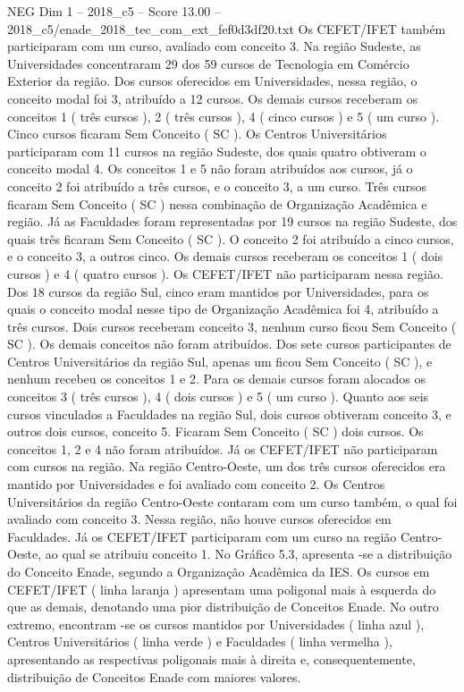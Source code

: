 \begin{textsample}{NEG Dim 1 – 2018\_c5 – Score 13.00 – 2018\_c5/enade\_2018\_tec\_com\_ext\_fef0d3df20.txt}
Os CEFET/IFET também participaram com um curso, avaliado com conceito 3.
Na região Sudeste, as Universidades concentraram 29 dos 59 cursos de Tecnologia em Comércio Exterior da região.
Dos cursos oferecidos em Universidades, nessa região, o conceito modal foi 3, atribuído a 12 cursos.
Os demais cursos receberam os conceitos 1 ( três cursos ), 2 ( três cursos ), 4 ( cinco cursos ) e 5 ( um curso ).
Cinco cursos ficaram Sem Conceito ( SC ).
Os Centros Universitários participaram com 11 cursos na região Sudeste, dos quais quatro obtiveram o conceito modal 4.
Os conceitos 1 e 5 não foram atribuídos aos cursos, já o conceito 2 foi atribuído a três cursos, e o conceito 3, a um curso.
Três cursos ficaram Sem Conceito ( SC ) nessa combinação de Organização Acadêmica e região.
Já as Faculdades foram representadas por 19 cursos na região Sudeste, dos quais três ficaram Sem Conceito ( SC ).
O conceito 2 foi atribuído a cinco cursos, e o conceito 3, a outros cinco.
Os demais cursos receberam os conceitos 1 ( dois cursos ) e 4 ( quatro cursos ).
Os CEFET/IFET não participaram nessa região.
Dos 18 cursos da região Sul, cinco eram mantidos por Universidades, para os quais o conceito modal nesse tipo de Organização Acadêmica foi 4, atribuído a três cursos.
Dois cursos receberam conceito 3, nenhum curso ficou Sem Conceito ( SC ).
Os demais conceitos não foram atribuídos.
Dos sete cursos participantes de Centros Universitários da região Sul, apenas um ficou Sem Conceito ( SC ), e nenhum recebeu os conceitos 1 e 2.
Para os demais cursos foram alocados os conceitos 3 ( três cursos ), 4 ( dois cursos ) e 5 ( um curso ).
Quanto aos seis cursos vinculados a Faculdades na região Sul, dois cursos obtiveram conceito 3, e outros dois cursos, conceito 5.
Ficaram Sem Conceito ( SC ) dois cursos.
Os conceitos 1, 2 e 4 não foram atribuídos.
Já os CEFET/IFET não participaram com cursos na região.
Na região Centro-Oeste, um dos três cursos oferecidos era mantido por Universidades e foi avaliado com conceito 2.
Os Centros Universitários da região Centro-Oeste contaram com um curso também, o qual foi avaliado com conceito 3.
Nessa região, não houve cursos oferecidos em Faculdades.
Já os CEFET/IFET participaram com um curso na região Centro-Oeste, ao qual se atribuiu conceito 1.
No Gráfico 5.3, apresenta -se a distribuição do Conceito Enade, segundo a Organização Acadêmica da IES.
Os cursos em CEFET/IFET ( linha laranja ) apresentam uma poligonal mais à esquerda do que as demais, denotando uma pior distribuição de Conceitos Enade.
No outro extremo, encontram -se os cursos mantidos por Universidades ( linha azul ), Centros Universitários ( linha verde ) e Faculdades ( linha vermelha ), apresentando as respectivas poligonais mais à direita e, consequentemente, distribuição de Conceitos Enade com maiores valores.

\end{textsample}
